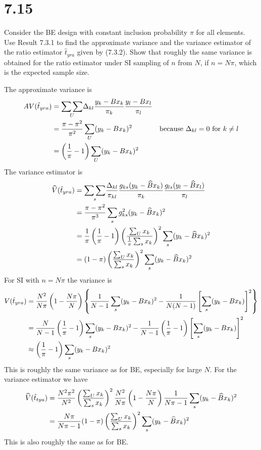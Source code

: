 \documentclass[12pt]{article}
\begin{document}

\section*{7.15}
Consider the BE design with constant inclusion probability $\pi$ for all elements.
Use Result 7.3.1 to find the approximate variance and the variance estimator
of the ratio estimator $\hat t_{yra}$ given by (7.3.2).
Show that roughly the same variance is obtained for the ratio estimator under SI
sampling of $n$ from $N$, if $n=N\pi$, which is the expected sample size.

The approximate variance is
\begin{align*}
AV(\hat t_{yra})
&=
\underset{U}{\sum\sum}
\Delta_{kl}{y_k-Bx_k\over\pi_k}{y_l-Bx_l\over\pi_l}\\
&=
{\pi-\pi^2\over\pi^2}\sum_U(y_k-Bx_k)^2 & \hbox{because $\Delta_{kl}=0$ for $k\ne l$}\\
&=
\left({1\over\pi}-1\right)
\sum_U(y_k-Bx_k)^2
\end{align*}
The variance estimator is
\begin{align*}
\widehat V(\hat t_{yra})
&=
\underset{s}{\sum\sum}
{\Delta_{kl}\over\pi_{kl}}
{g_{ks}(y_k-\widehat Bx_k)\over\pi_k}
{g_{ls}(y_l-\widehat Bx_l)\over\pi_l}\\
&=
{\pi-\pi^2\over\pi^3}\sum_sg_{ks}^2(y_k-\widehat Bx_k)^2\\
&=
{1\over\pi}\left({1\over\pi}-1\right)
\left({\sum_Ux_k\over{1\over\pi}\sum_s{x_k}}\right)^2
\sum_s(y_k-\widehat Bx_k)^2\\
&=
(1-\pi)\left({\sum_Ux_k\over\sum_s{x_k}}\right)^2
\sum_s(y_k-\widehat Bx_k)^2
\end{align*}
For SI with $n=N\pi$ the variance is
\begin{align*}
V(\hat t_{yra})
&=
{N^2\over N\pi}\left(1-{N\pi\over N}\right)
\left\{
{1\over N-1}\sum_s(y_k-Bx_k)^2-
{1\over N(N-1)}\left[\sum_s(y_k-Bx_k)\right]^2\right\}\\
&=
{N\over N-1}\left({1\over\pi}-1\right)\sum_s(y_k-Bx_k)^2
-{1\over N-1}\left({1\over\pi}-1\right)\left[\sum_s(y_k-Bx_k)\right]^2\\
&\approx
\left({1\over\pi}-1\right)\sum_s(y_k-Bx_k)^2
\end{align*}
This is roughly the same variance as for BE, especially for large $N$.
For the variance estimator we have
\begin{align*}
\widehat V(\hat t_{tya})
&=
{N^2\pi^2\over N^2}
\left(\sum_Ux_k\over\sum_sx_k\right)^2{N^2\over N\pi}
\left(1-{N\pi\over N}\right)
{1\over N\pi-1}\sum_s(y_k-\widehat Bx_k)^2\\
&={N\pi\over N\pi-1}(1-\pi)\left(\sum_Ux_k\over\sum_sx_k\right)^2
\sum_s(y_k-\widehat Bx_k)^2
\end{align*}
This is also roughly the same as for BE.
\end{document}
